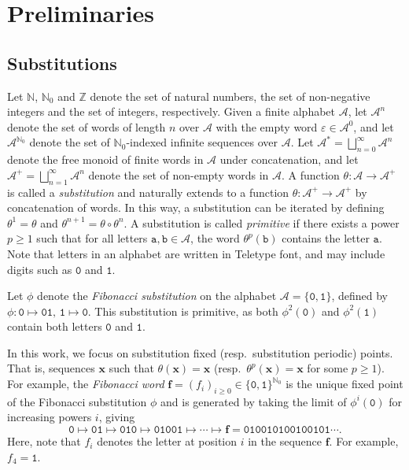 \documentclass[10pt,a4paper,reqno]{amsart}
\newcommand{\Z}{{\mathbb Z}}
\newcommand{\N}{{\mathbb N}}
\newcommand{\bff}{{\mathbf f}}
\newcommand{\bfx}{{\mathbf x}}
\newcommand{\mc}{\mathcal}
\newcommand{\A}{\mc A}
\begin{document}
\section{Preliminaries}\label{SEC:prelims}
\subsection{Substitutions}\label{SEC:subs}
Let $\N$, $\N_0$ and $\Z$ denote the set of natural numbers, the set of non-negative integers and the set of integers, respectively. Given a finite alphabet $\mathcal A$, let $\A^n$ denote the set of words of length $n$ over $\A$ with the empty word $\varepsilon \in \A^0$, and let $\mathcal{A}^{\N_0}$ denote the set of $\N_0$-indexed infinite sequences over $\mathcal{A}$. Let $\mathcal A^{*} = \bigsqcup_{n=0}^\infty \A^n$ denote the free monoid of finite words in $\mathcal{A}$ under concatenation, and let $\mathcal{A}^+ =\bigsqcup_{n=1}^\infty \A^n$ denote the set of non-empty words in $\mathcal A$. A function $\theta\colon\mathcal{A}\to \mathcal{A}^+$ is called a {\em substitution} and naturally extends to a function $\theta\colon\A^+\to\A^+$ by concatenation of words. In this way, a substitution can be iterated by defining $\theta^1=\theta$ and $\theta^{n+1} = \theta \circ \theta^{n}$. A substitution is called {\em primitive} if there exists a power $p\geq 1$ such that for all letters $\mathtt{a,b} \in \A$, the word $\theta^p(\mathtt{b})$ contains the letter $\mathtt{a}$. Note that letters in an alphabet are written in {\ttfamily Teletype} font, and may include digits such as $\mathtt{0}$ and $\mathtt{1}$.
\begin{example}\label{fibsub}
Let $\phi$ denote the {\em Fibonacci substitution} on the alphabet $\A=\{\mathtt{0,1}\}$, defined by $\phi\colon\mathtt{0}\mapsto \mathtt{01},\, \mathtt{1}\mapsto \mathtt{0}$. This substitution is primitive, as both $\phi^2(\mathtt{0})$ and $\phi^2(\mathtt{1})$ contain both letters $\mathtt{0}$ and $\mathtt{1}$.
\end{example}

In this work, we focus on substitution fixed (resp.~substitution periodic) points. That is, sequences $\bfx$ such that $\theta(\bfx)=\bfx$ (resp.~$\theta^p(\bfx)=\bfx$ for some $p \geq 1$). For example, the {\em Fibonacci word} $\bff=\left( f_i\right)_{i\geq0}\in \{\mathtt{0,1}\}^{\N_0}$ is the unique fixed point of the Fibonacci substitution $\phi$ and is generated by taking the limit of $\phi^i(\mathtt{0})$ for increasing powers $i$, giving
\[\mathtt{0}\mapsto \mathtt{01} \mapsto \mathtt{010} \mapsto \mathtt{01001} \mapsto \cdots \mapsto \bff = \mathtt{010010100100101}\cdots.\]
Here, note that $f_i$ denotes the letter at position $i$ in the sequence $\bff$. For example, $f_4=\mathtt{1}$. 
\end{document}
